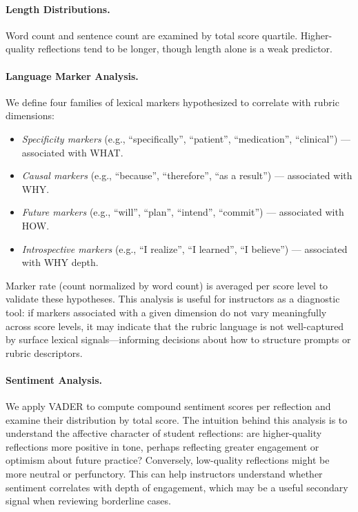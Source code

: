 \documentclass[11pt]{article}
\begin{document}
\paragraph{Length Distributions.} Word count and sentence count are examined by total score quartile. Higher-quality reflections tend to be longer, though length alone is a weak predictor.

\paragraph{Language Marker Analysis.} We define four families of lexical markers hypothesized to correlate with rubric dimensions:
\begin{itemize}
    \item \textit{Specificity markers} (e.g., ``specifically'', ``patient'', ``medication'', ``clinical'') — associated with WHAT.
    \item \textit{Causal markers} (e.g., ``because'', ``therefore'', ``as a result'') — associated with WHY.
    \item \textit{Future markers} (e.g., ``will'', ``plan'', ``intend'', ``commit'') — associated with HOW.
    \item \textit{Introspective markers} (e.g., ``I realize'', ``I learned'', ``I believe'') — associated with WHY depth.
\end{itemize}
Marker rate (count normalized by word count) is averaged per score level to validate these hypotheses. This analysis is useful for instructors as a diagnostic tool: if markers associated with a given dimension do not vary meaningfully across score levels, it may indicate that the rubric language is not well-captured by surface lexical signals—informing decisions about how to structure prompts or rubric descriptors.

\paragraph{Sentiment Analysis.} We apply VADER \citep{hutto2014vader} to compute compound sentiment scores per reflection and examine their distribution by total score. The intuition behind this analysis is to understand the affective character of student reflections: are higher-quality reflections more positive in tone, perhaps reflecting greater engagement or optimism about future practice? Conversely, low-quality reflections might be more neutral or perfunctory. This can help instructors understand whether sentiment correlates with depth of engagement, which may be a useful secondary signal when reviewing borderline cases.
\end{document}
